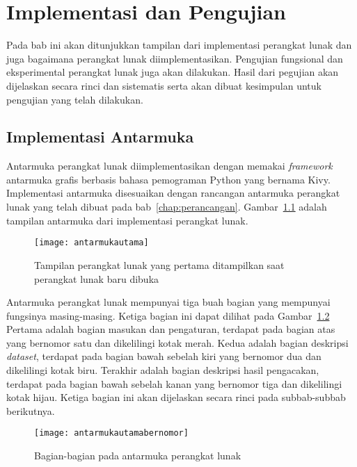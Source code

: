 \chapter{Implementasi dan Pengujian}
\label{chap:implementasi}

Pada bab ini akan ditunjukkan tampilan dari implementasi perangkat lunak dan juga bagaimana perangkat lunak diimplementasikan. Pengujian fungsional dan eksperimental perangkat lunak juga akan dilakukan. Hasil dari pegujian akan dijelaskan secara rinci dan sistematis serta akan dibuat kesimpulan untuk pengujian yang telah dilakukan.

\section{Implementasi Antarmuka}
\label{sec:implementasi-antarmuka}

Antarmuka perangkat lunak diimplementasikan dengan memakai \textit{framework} antarmuka grafis berbasis bahasa pemograman Python yang bernama Kivy. Implementasi antarmuka disesuaikan dengan rancangan antarmuka perangkat lunak yang telah dibuat pada bab~\ref{chap:perancangan}. Gambar~\ref{fig:antarmukautama} adalah tampilan antarmuka dari implementasi perangkat lunak.

\begin{figure}
	\centering
	\texttt{[image: antarmukautama]}
	\caption{Tampilan perangkat lunak yang pertama ditampilkan saat perangkat lunak baru dibuka}
	\label{fig:antarmukautama}
\end{figure}

Antarmuka perangkat lunak mempunyai tiga buah bagian yang mempunyai fungsinya masing-masing. Ketiga bagian ini dapat dilihat pada Gambar~\ref{fig:antarmukautamabernomor} Pertama adalah bagian masukan dan pengaturan, terdapat pada bagian atas yang bernomor satu dan dikelilingi kotak merah. Kedua adalah bagian deskripsi \textit{dataset}, terdapat pada bagian bawah sebelah kiri yang bernomor dua dan dikelilingi kotak biru. Terakhir adalah bagian deskripsi hasil pengacakan, terdapat pada bagian bawah sebelah kanan yang bernomor tiga dan dikelilingi kotak hijau. Ketiga bagian ini akan dijelaskan secara rinci pada subbab-subbab berikutnya.

\begin{figure}
	\centering
	\texttt{[image: antarmukautamabernomor]}
	\caption{Bagian-bagian pada antarmuka perangkat lunak}
	\label{fig:antarmukautamabernomor}
\end{figure}

